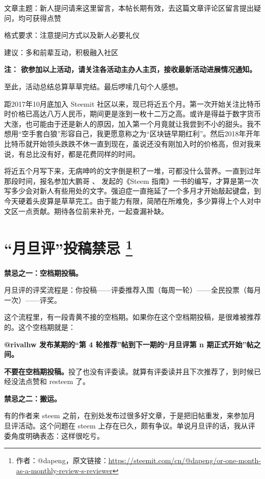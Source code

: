 \documentclass[]{ctexbook}
\begin{document}
文章主题：新人提问请来这里留言，本帖长期有效，去这篇文章评论区留言提出疑问，均可获得点赞

格式要求：注意提问方式以及新人必要礼仪

建议：多和前辈互动，积极融入社区

\textbf{注：
欲参加以上活动，请关注各活动主办人主页，接收最新活动进展情况通知。}

至此，活动总结总算草草完结。最后啰嗦几句个人感想。

距2017年10月底加入 Steemit 社区以来，现已将近五个月。第一次开始关注比特币时价格已高达八万人民币，期间更是涨到一枚十二万之高。或许是得益于数字货币大涨，也可能由于还是新人的原因，加入第一个月竟就让我尝到不小的甜头。我不想用``空手套白狼''形容自己，我更愿意称之为``区块链早期红利''。然后2018年开年比特币就开始领头跌跌不休一直到现在，虽说还没有刚加入时的价格高，但对我来说，有总比没有好，都是花费同样的时间。

将近五个月写下来，无病呻吟的文字倒是积了一堆，可都没什么营养。一直到过年那段时间，报名参加大鹏哥 、\citet{dapeng} 发起的《Steem 指南》一书的编写，才算是第一次写多少会对新人有些用处的文字。强迫症一直拖延了一个多月才开始敲起键盘，到今天硬着头皮算是草草完工。由于能力有限，简陋在所难免，多少算得上个人对中文区一点贡献。期待各位前来补充，一起查漏补缺。

\section[``月旦评''投稿禁忌 ]{\texorpdfstring{``月旦评''投稿禁忌 \footnote{作者：@dapeng，原文链接：\url{https://steemit.com/cn/@dapeng/or-one-month-as-a-monthly-review-s-reviewer}}}{``月旦评''投稿禁忌 }}

\textbf{禁忌之一：空档期投稿。}

月旦评的评奖流程是：你投稿------评委推荐入围（每周一轮）------全民投票（每月一次）------评奖。

这个流程里，有一段青黄不接的空档期。如果你在这个空档期投稿，是很难被推荐的。这个空档期就是：

\textbf{@rivalhw 发布某期的``第 4 轮推荐''帖到下一期的``月旦评第 n 期正式开始''帖之间。}

\textbf{不要在空档期投稿。}投了也没有评委读。就算有评委读并且下次推荐了，到时候已经没法点赞和 resteem 了。

\textbf{禁忌之二：搬运。}

有的作者来 steem 之前，在别处发布过很多好文章，于是把旧帖重发，来参加月旦评活动。这个问题在 steem 上存在已久，颇有争议。单说月旦评的话，我从评委角度明确表态：这样很吃亏。
\end{document}
